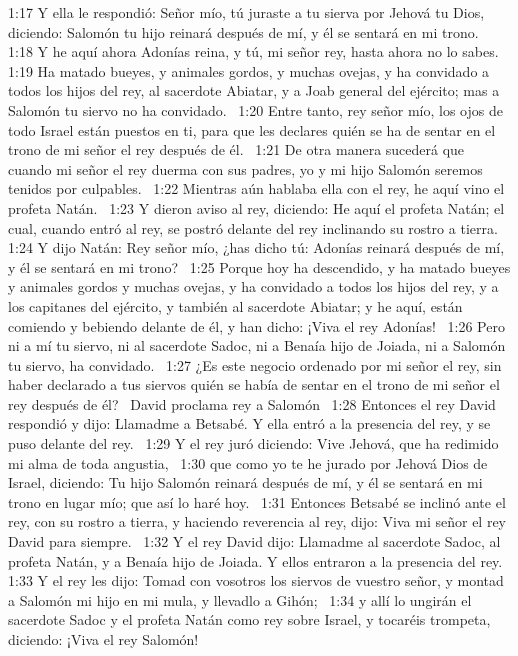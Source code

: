 1:17 Y ella le respondió: Señor mío, tú juraste a tu sierva por Jehová tu Dios, diciendo: Salomón tu hijo reinará después de mí, y él se sentará en mi trono.  
1:18 Y he aquí ahora Adonías reina, y tú, mi señor rey, hasta ahora no lo sabes.  
1:19 Ha matado bueyes, y animales gordos, y muchas ovejas, y ha convidado a todos los hijos del rey, al sacerdote Abiatar, y a Joab general del ejército; mas a Salomón tu siervo no ha convidado.  
1:20 Entre tanto, rey señor mío, los ojos de todo Israel están puestos en ti, para que les declares quién se ha de sentar en el trono de mi señor el rey después de él.  
1:21 De otra manera sucederá que cuando mi señor el rey duerma con sus padres, yo y mi hijo Salomón seremos tenidos por culpables.  
1:22 Mientras aún hablaba ella con el rey, he aquí vino el profeta Natán.  
1:23 Y dieron aviso al rey, diciendo: He aquí el profeta Natán; el cual, cuando entró al rey, se postró delante del rey inclinando su rostro a tierra.  
1:24 Y dijo Natán: Rey señor mío, ¿has dicho tú: Adonías reinará después de mí, y él se sentará en mi trono?  
1:25 Porque hoy ha descendido, y ha matado bueyes y animales gordos y muchas ovejas, y ha convidado a todos los hijos del rey, y a los capitanes del ejército, y también al sacerdote Abiatar; y he aquí, están comiendo y bebiendo delante de él, y han dicho: ¡Viva el rey Adonías!  
1:26 Pero ni a mí tu siervo, ni al sacerdote Sadoc, ni a Benaía hijo de Joiada, ni a Salomón tu siervo, ha convidado.  
1:27 ¿Es este negocio ordenado por mi señor el rey, sin haber declarado a tus siervos quién se había de sentar en el trono de mi señor el rey después de él?  
David proclama rey a Salomón  
1:28 Entonces el rey David respondió y dijo: Llamadme a Betsabé. Y ella entró a la presencia del rey, y se puso delante del rey.  
1:29 Y el rey juró diciendo: Vive Jehová, que ha redimido mi alma de toda angustia,  
1:30 que como yo te he jurado por Jehová Dios de Israel, diciendo: Tu hijo Salomón reinará después de mí, y él se sentará en mi trono en lugar mío; que así lo haré hoy.  
1:31 Entonces Betsabé se inclinó ante el rey, con su rostro a tierra, y haciendo reverencia al rey, dijo: Viva mi señor el rey David para siempre.  
1:32 Y el rey David dijo: Llamadme al sacerdote Sadoc, al profeta Natán, y a Benaía hijo de Joiada. Y ellos entraron a la presencia del rey.  
1:33 Y el rey les dijo: Tomad con vosotros los siervos de vuestro señor, y montad a Salomón mi hijo en mi mula, y llevadlo a Gihón;  
1:34 y allí lo ungirán el sacerdote Sadoc y el profeta Natán como rey sobre Israel, y tocaréis trompeta, diciendo: ¡Viva el rey Salomón!  
